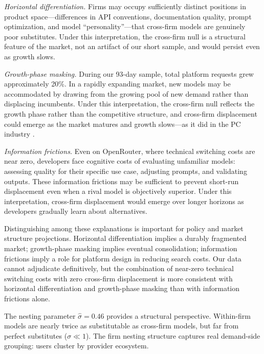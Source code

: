 \documentclass[11pt, a4paper]{article}
\begin{document}
\emph{Horizontal differentiation.} Firms may occupy sufficiently distinct positions in product space---differences in API conventions, documentation quality, prompt optimization, and model ``personality''---that cross-firm models are genuinely poor substitutes. Under this interpretation, the cross-firm null is a structural feature of the market, not an artifact of our short sample, and would persist even as growth slows.

\emph{Growth-phase masking.} During our 93-day sample, total platform requests grew approximately 20\%. In a rapidly expanding market, new models may be accommodated by drawing from the growing pool of new demand rather than displacing incumbents. Under this interpretation, the cross-firm null reflects the growth phase rather than the competitive structure, and cross-firm displacement could emerge as the market matures and growth slows---as it did in the PC industry \citep{bresnahan1999technological}.

\emph{Information frictions.} Even on OpenRouter, where technical switching costs are near zero, developers face cognitive costs of evaluating unfamiliar models: assessing quality for their specific use case, adjusting prompts, and validating outputs. These information frictions may be sufficient to prevent short-run displacement even when a rival model is objectively superior. Under this interpretation, cross-firm displacement would emerge over longer horizons as developers gradually learn about alternatives.

Distinguishing among these explanations is important for policy and market structure projections. Horizontal differentiation implies a durably fragmented market; growth-phase masking implies eventual consolidation; information frictions imply a role for platform design in reducing search costs. Our data cannot adjudicate definitively, but the combination of near-zero technical switching costs with zero cross-firm displacement is more consistent with horizontal differentiation and growth-phase masking than with information frictions alone.

The nesting parameter $\hat{\sigma} = 0.46$ provides a structural perspective. Within-firm models are nearly twice as substitutable as cross-firm models, but far from perfect substitutes ($\sigma \ll 1$). The firm nesting structure captures real demand-side grouping: users cluster by provider ecosystem.
\end{document}
